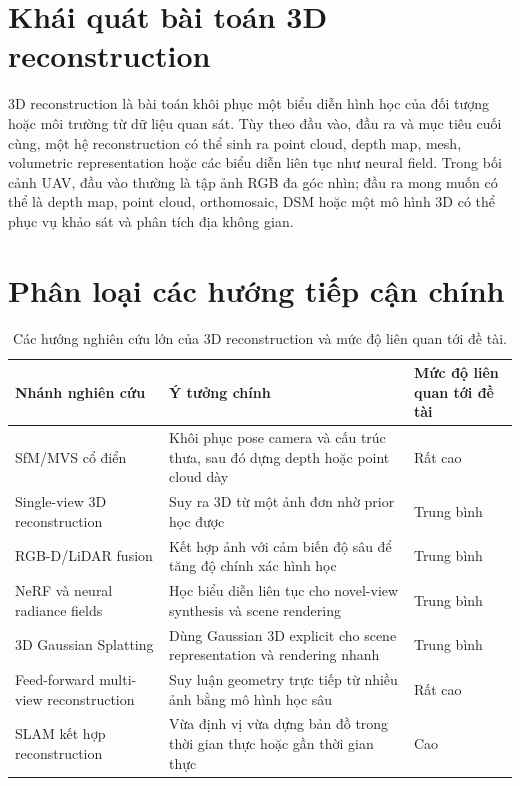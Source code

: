 \documentclass[../DoAn.tex]{subfiles}
\begin{document}
\section{Khái quát bài toán 3D reconstruction}

3D reconstruction là bài toán khôi phục một biểu diễn hình học của đối tượng hoặc môi trường từ dữ liệu quan sát. Tùy theo đầu vào, đầu ra và mục tiêu cuối cùng, một hệ reconstruction có thể sinh ra point cloud, depth map, mesh, volumetric representation hoặc các biểu diễn liên tục như neural field. Trong bối cảnh UAV, đầu vào thường là tập ảnh RGB đa góc nhìn; đầu ra mong muốn có thể là depth map, point cloud, orthomosaic, DSM hoặc một mô hình 3D có thể phục vụ khảo sát và phân tích địa không gian.

\section{Phân loại các hướng tiếp cận chính}

\begin{table}[t]
\centering
\small
\begin{tabularx}{\textwidth}{>{\raggedright\arraybackslash}p{3.5cm} >{\raggedright\arraybackslash}X >{\raggedright\arraybackslash}p{3.4cm}}
\toprule
\textbf{Nhánh nghiên cứu} & \textbf{Ý tưởng chính} & \textbf{Mức độ liên quan tới đề tài} \\
\midrule
SfM/MVS cổ điển & Khôi phục pose camera và cấu trúc thưa, sau đó dựng depth hoặc point cloud dày & Rất cao \\
Single-view 3D reconstruction & Suy ra 3D từ một ảnh đơn nhờ prior học được & Trung bình \\
RGB-D/LiDAR fusion & Kết hợp ảnh với cảm biến độ sâu để tăng độ chính xác hình học & Trung bình \\
NeRF và neural radiance fields & Học biểu diễn liên tục cho novel-view synthesis và scene rendering & Trung bình \\
3D Gaussian Splatting & Dùng Gaussian 3D explicit cho scene representation và rendering nhanh & Trung bình \\
Feed-forward multi-view reconstruction & Suy luận geometry trực tiếp từ nhiều ảnh bằng mô hình học sâu & Rất cao \\
SLAM kết hợp reconstruction & Vừa định vị vừa dựng bản đồ trong thời gian thực hoặc gần thời gian thực & Cao \\
\bottomrule
\end{tabularx}
\caption{Các hướng nghiên cứu lớn của 3D reconstruction và mức độ liên quan tới đề tài.}
\label{tab:survey-directions}
\end{table}
\end{document}
